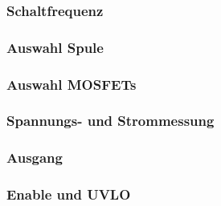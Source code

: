 

\subsubsection{Schaltfrequenz}



\subsubsection{Auswahl Spule}



\subsubsection{Auswahl MOSFETs}



\subsubsection{Spannungs- und Strommessung}



\subsubsection{Ausgang}



\subsubsection{Enable und UVLO}



